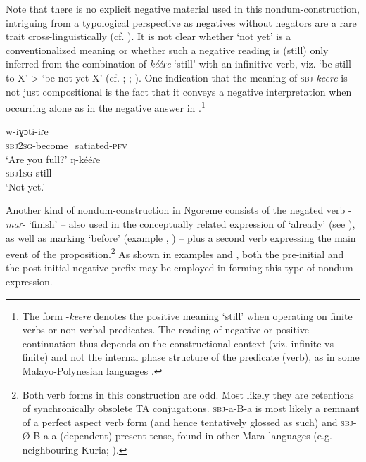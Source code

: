 \documentclass[output=paper,colorlinks,citecolor=brown,draftmode]{langscibook}
\begin{document}
Note that there is no explicit negative material used in this nondum-construc\-tion, intriguing from a typological perspective as negatives without negators are a rare trait cross-linguistically (cf. \citealt{Miestamo2010}). It is not clear whether ‘not yet’ is a conventionalized meaning or whether such a negative reading is (still) only inferred from the combination of \textit{kééɾe} ‘still’ with an infinitive verb, viz. ‘be still to X’ > ‘be not yet X’ (cf. \citealt{Güldemann1998}; \citealt[147--148]{Nurse2008}; \citealt{VeselinovaDevos2021}). One indication that the meaning of \textsc{sbj}{}-\textit{keere} is not just compositional is the fact that it conveys a negative interpretation when occurring alone as in the negative answer in .\footnote{The form \nobreakdash-\textit{keere} denotes the positive meaning ‘still’ when operating on finite verbs or non-verbal predicates. The reading of negative or positive continuation thus depends on the constructional context (viz. infinite vs finite) and not the internal phase structure of the predicate (verb), as in some Malayo-Polynesian languages \citep[see][]{VeselinovaEtAlFC}.}

\ea\label{ex:ngo:61}
    \begin{xlist}[Q: ]
    \label{ex:ngo:61A}
        \gll w{}-iɣɔti-iɾe \\ 
            \textsc{sbj}2\textsc{sg}{}-become\_satiated-\textsc{pfv}\\
         \glt ‘Are you full?’
    \label{ex:ngo:61B}
        \gll ŋ{}-kééɾe\\ 
            \textsc{sbj}1\textsc{sg}{}-still\\
         \glt ‘Not yet.’
    \end{xlist}
\z 

Another kind of nondum-construction in Ngoreme consists of the negated verb \nobreakdash-\textit{maɾ}\nobreakdash- ‘finish’ – also used in the conceptually related expression of ‘already’ (see \citealt{BernanderEtAl2023b}), as well as marking ‘before’ (example , ) – plus a second verb expressing the main event of the proposition.\footnote{Both verb forms in this construction are odd. Most likely they are retentions of synchronically obsolete TA conjugations. \textsc{sbj}-a-B-a is most likely a remnant of a perfect aspect verb form (and hence tentatively glossed as such) and \textsc{sbj}-Ø-B-a a (dependent) present tense, found in other Mara languages (e.g. neighbouring Kuria; \citealt[286--287]{Cammenga2004}).} As shown in examples  and , both the pre-initial and the post-initial negative prefix may be employed in forming this type of nondum-expression.
\end{document}
